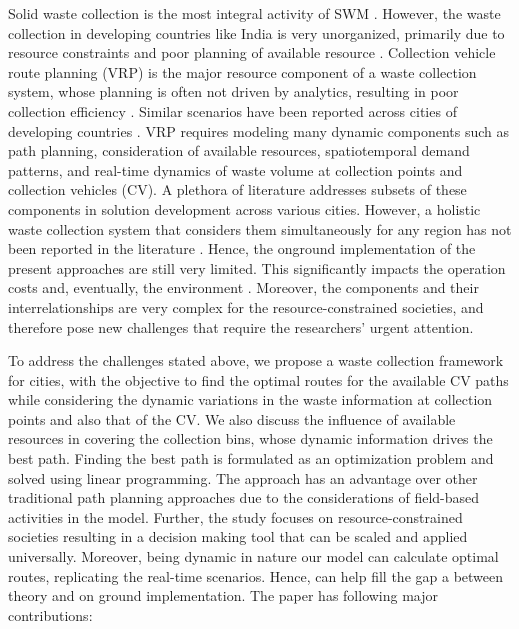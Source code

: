 \documentclass[12pt]{article}
\begin{document}
Solid waste collection is the most integral activity of SWM \cite{GUPTA2015206}. However, the waste collection in developing countries like India is very unorganized, primarily due to resource constraints and poor planning of available resource \cite{somani2021integrated}. Collection vehicle route planning (VRP) is the major resource component of a waste collection system, whose planning is often not driven by analytics, resulting in poor collection efficiency \cite{akbarpour2021innovative}. Similar scenarios have been reported across cities of developing countries \cite{anagnostopoulos2014effective, anagnostopoulos2015assessing, alwabli2020dynamic}. VRP requires modeling many dynamic components such as path planning, consideration of available resources, spatiotemporal demand patterns, and real-time dynamics of waste volume at collection points and collection vehicles (CV). A plethora of literature addresses subsets of these components in solution development across various cities\cite{dugdhe2016efficient,chaudhari2018solid,badve2020garbage}. However, a holistic waste collection system that considers them simultaneously for any region has not been reported in the literature \cite{han2015waste}. Hence, the onground implementation of the present approaches are still very limited. This significantly impacts the operation costs and, eventually, the environment \cite{apaydin2007route}. Moreover, the components and their interrelationships are very complex for the resource-constrained societies, and therefore pose new challenges that require the researchers' urgent attention.

To address the challenges stated above, we propose a waste collection framework for cities, with the objective to find the optimal routes for the available CV paths while considering the dynamic variations in the waste information at collection points and also that of the CV. We also discuss the influence of available resources in covering the collection bins, whose dynamic information drives the best path. Finding the best path is formulated as an optimization problem and solved using linear programming. The approach has an advantage over other traditional path planning approaches due to the considerations of field-based activities in the model. Further, the study  focuses on resource-constrained societies resulting in a decision making tool that can be scaled and applied universally. Moreover, being dynamic in nature our model can calculate optimal routes, replicating the real-time scenarios. Hence, can help fill the gap a between theory and on ground implementation. The paper has following major contributions:
\end{document}

